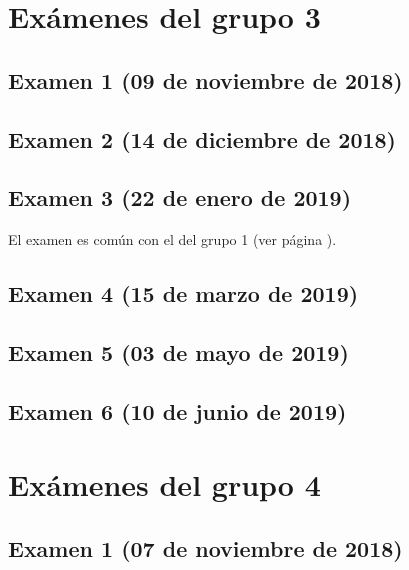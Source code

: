 \documentclass[a4paper,12pt,twoside]{book}
\begin{document}
\chapter{Exámenes del grupo 3}
\section{Examen 1 (09 de noviembre de 2018)}
\section{Examen 2 (14 de diciembre de 2018)}
\section{Examen 3 (22 de enero de 2019)}
El examen es común con el del grupo 1 (ver página \pageref{examen_18_19_1_3}).
\section{Examen 4 (15 de marzo de 2019)}
\section{Examen 5 (03 de mayo de 2019)}
\section{Examen 6 (10 de junio de 2019)}
 \label{examen_18_19_3_6}

\chapter{Exámenes del grupo 4}
\section{Examen 1 (07 de noviembre de 2018)}
\end{document}
